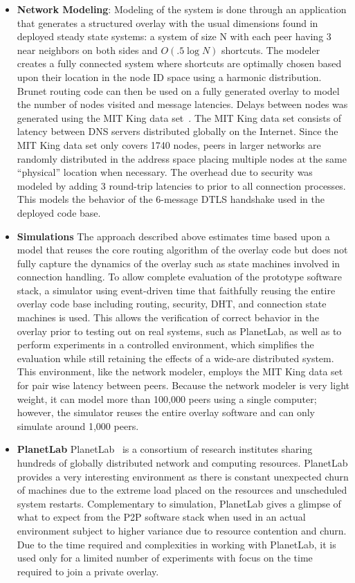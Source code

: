 \begin{itemize}
\item \textbf{Network Modeling}: Modeling of the system is done through an
application that generates a structured overlay with the usual dimensions found
in deployed steady state systems: a system of size N with each peer having 3
near neighbors on both sides and $O(.5\log N)$ shortcuts.  The modeler creates a
fully connected system where shortcuts are optimally chosen based upon their
location in the node ID space using a harmonic distribution.  Brunet routing
code can then be used on a fully generated overlay to model the number of
nodes visited and message latencies.  Delays between nodes was generated using
the MIT King data set~\cite{king_data}.  The MIT King data set consists of
latency between DNS servers distributed globally on the Internet.  Since the
MIT King data set only covers 1740 nodes, peers in larger networks are
randomly distributed in the address space placing multiple nodes at the same
``physical'' location when necessary. The overhead due to security was modeled
by adding 3 round-trip latencies to prior to all connection processes. This
models the behavior of the 6-message DTLS handshake used in the deployed code
base.
\item \textbf{Simulations} The approach described above estimates time based
upon a model that reuses the core routing algorithm of the overlay code but
does not fully capture the dynamics of the overlay such as state machines
involved in connection handling.  To allow complete evaluation of the prototype
software stack, a simulator using event-driven time that faithfully reusing the
entire overlay code base including routing, security, DHT, and connection state
machines is used.  This allows the verification of correct behavior in the
overlay prior to testing out on real systems, such as PlanetLab, as well as to
perform experiments in a controlled environment, which simplifies the
evaluation while still retaining the effects of a wide-are distributed system.
This environment, like the network modeler, employs the MIT King data
set~\cite{king_data} for pair wise latency between peers.  Because the network
modeler is very light weight, it can model more than 100,000 peers using a
single computer; however, the simulator reuses the entire overlay software and
can only simulate around 1,000 peers.
\item \textbf{PlanetLab} PlanetLab~\cite{planetlab} is a consortium of research
institutes sharing hundreds of globally distributed network and computing
resources.  PlanetLab provides a very interesting environment as there is
constant unexpected churn of machines due to the extreme load placed on the
resources and unscheduled system restarts.  Complementary to simulation,
PlanetLab gives a glimpse of what to expect from the P2P software stack when
used in an actual environment subject to higher variance due to resource
contention and churn.  Due to the time required and complexities in working with
PlanetLab, it is used only for a limited number of experiments with focus on the
time required to join a private overlay.
\end{itemize}

